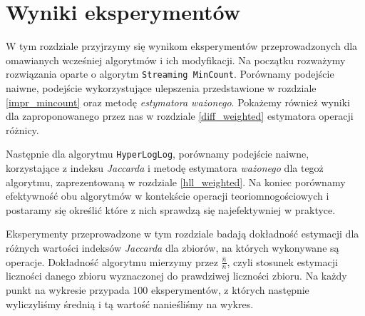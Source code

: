 \chapter{Wyniki eksperymentów}
\thispagestyle{chapterBeginStyle}

W tym rozdziale przyjrzymy się wynikom  eksperymentów przeprowadzonych dla omawianych wcześniej algorytmów i ich modyfikacji. Na początku rozważymy rozwiązania oparte o algorytm \texttt{Streaming MinCount}. 
Porównamy podejście naiwne, podejście wykorzystujące ulepszenia przedstawione w rozdziale \ref{impr_mincount} oraz metodę \textit{estymatora ważonego}. Pokażemy również wyniki dla zaproponowanego przez nas w rozdziale \ref{diff_weighted} estymatora operacji różnicy.

 Następnie dla algorytmu \texttt{HyperLogLog}, 
 porównamy podejście naiwne, korzystające z indeksu \textit{Jaccarda} i metodę estymatora \textit{ważonego} dla tegoż algorytmu, zaprezentowaną w rozdziale \ref{hll_weighted}. Na koniec porównamy efektywność obu algorytmów w kontekście operacji teoriomnogościowych i postaramy się określić które z nich sprawdzą się najefektywniej w praktyce. 

Eksperymenty przeprowadzone w tym rozdziale badają dokładność estymacji dla różnych wartości indeksów \textit{Jaccarda} dla zbiorów, na których wykonywane są operacje. Dokładność algorytmu mierzymy przez $\frac{\hat{n}}{n}$, czyli stosunek estymacji liczności danego zbioru wyznaczonej do prawdziwej liczności zbioru. Na każdy punkt na wykresie przypada 100 eksperymentów, z których następnie wyliczyliśmy średnią i tą wartość nanieśliśmy na wykres.

